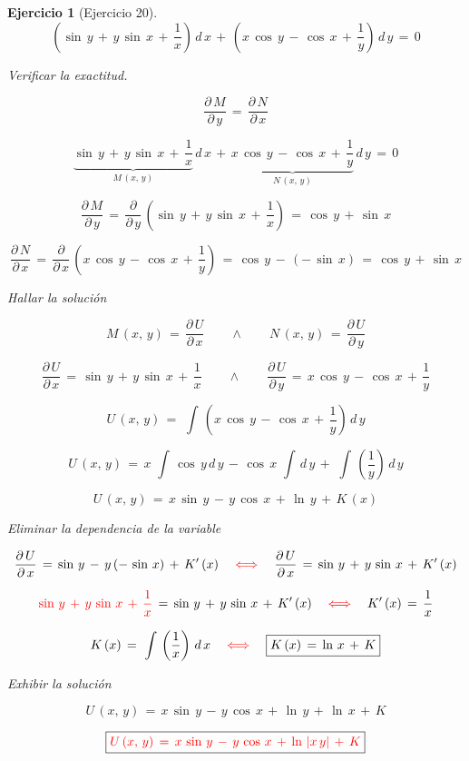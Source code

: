 \documentclass[a4paper,11pt]{book}
\newtheorem{ejer}{Ejercicio}[section]
\begin{document}
\begin{ejer}[Ejercicio 20] 

  $$\left(\sin\,y\,+\,y\,\sin\,x\,+\,\dfrac{1}{x} \right)\,d\,x\,+\,\left(x\,\cos\,y\,-\,\cos\,x\,+\,\dfrac{1}{y} \right)\,d\,y\,=\,0$$ 

 Verificar la exactitud. 

$$\dfrac{\partial\,M}{\partial\,y}\,=\,\dfrac{\partial\,N}{\partial\,x}$$ 

$$\underbrace{\sin\,y\,+\,y\,\sin\,x\,+\,\dfrac{1}{x}}_{M\,(x,\,y)} \,d\,x\,+\,\underbrace{x\,\cos\,y\,-\,\cos\,x\,+\,\dfrac{1}{y}}_{N\,(x,\,y)}\,d\,y\,=\,0$$ 

$$\dfrac{\partial\,M}{\partial\,y}\,=\,\dfrac{\partial}{\partial\,y}\,\left(\sin\,y\,+\,y\,\sin\,x\,+\,\dfrac{1}{x} \right)\,=\,\boxed{\cos\,y\,+\,\sin\,x}$$ 

$$\dfrac{\partial\,N}{\partial\,x}\,=\,\dfrac{\partial}{\partial\,x}\,\left(x\,\cos\,y\,-\,\cos\,x\,+\,\dfrac{1}{y} \right)\,=\,\cos\,y\,-\,(-\,\sin\,x)\,=\,\boxed{\cos\,y\,+\,\sin\,x}$$ 

 Hallar la solución 

$$\boxed{M\,(x,\,y)\,=\,\dfrac{\partial\,U}{\partial\,x}} \qquad \wedge \qquad \boxed{N\,(x,\,y)\,=\,\dfrac{\partial\,U}{\partial\,y}}$$

$$\boxed{\dfrac{\partial\,U}{\partial\,x}\,=\,\sin\,y\,+\,y\,\sin\,x\,+\,\dfrac{1}{x} } \qquad \wedge \qquad \boxed{\dfrac{\partial\,U}{\partial\,y}\,=\,x\,\cos\,y\,-\,\cos\,x\,+\,\dfrac{1}{y} }$$ 

$$U\,(x,\,y)\,=\,\displaystyle\,\int\,\left(x\,\cos\,y\,-\,\cos\,x\,+\,\dfrac{1}{y} \right)\,d\,y$$ 

$$U\,(x,\,y)\,=\,x\,\displaystyle\,\int\,\cos\,y\,d\,y\,-\,\cos\,x\,\displaystyle\,\int\,d\,y\,+\,\displaystyle\,\int\,\left(\dfrac{1}{y} \right)\,d\,y$$ 

$$\boxed{U\,(x,\,y)\,=\,x\,\sin\,y\,-\,y\,\cos\,x\,+\,\ln\,y\,+\,K\,(x)}$$ 

 Eliminar la dependencia de la variable 

$$\dfrac{\partial\,U}{\partial\,x}\,=\,\sin\,y\,-\,y\,(-\,\sin\,x)\,+\,K'\,(x) \quad \textcolor{red}{\iff} \quad \dfrac{\partial\,U}{\partial\,x}\,=\,\sin\,y\,+\,y\,\sin\,x\,+\,K'\,(x)$$ 

$$\textcolor{red}{\sin\,y\,+\,y\,\sin\,x\,+\,\dfrac{1}{x}}\,=\,\sin\,y\,+\,y\,\sin\,x\,+\,K'\,(x) \quad \textcolor{red}{\iff} \quad K'\,(x)\,=\,\dfrac{1}{x}$$ 

$$K\,(x)\,=\,\displaystyle\,\int\,\left(\dfrac{1}{x} \right)\,d\,x \quad \textcolor{red}{\iff} \quad \boxed{K\,(x)\,=\,\ln\,x\,+\,K}$$ 

 Exhibir la solución  

$$U\,(x,\,y)\,=\,x\,\sin\,y\,-\,y\,\cos\,x\,+\,\ln\,y\,+\,\ln\,x\,+\,K$$ 

$$\boxed{\textcolor{red}{U\,(x,\,y)\,=\,x\,\sin\,y\,-\,y\,\cos\,x\,+\,\ln\,|x\,y|\,+\,K } }$$ 

\end{ejer} 
\end{document}
